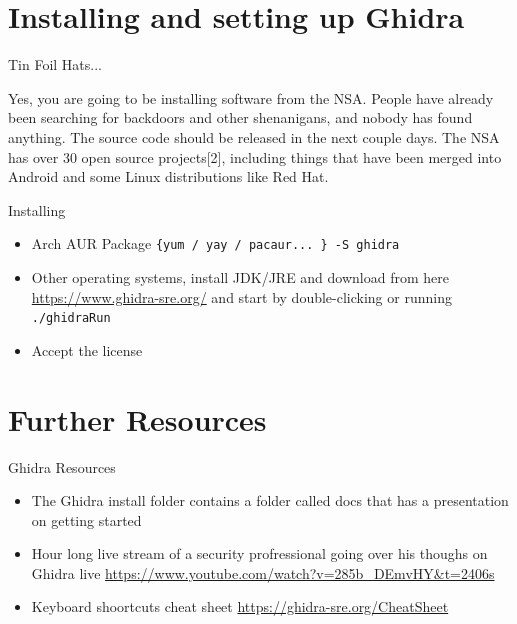 \documentclass{beamer}
\begin{document}
\section{Installing and setting up Ghidra}

\begin{frame}{Tin Foil Hats...}

  Yes, you are going to be installing software from the NSA. People
  have already been searching for backdoors and other shenanigans, and
  nobody has found anything. The source code should be released in the
  next couple days. The NSA has over 30 open source projects[2],
  including things that have been merged into Android and some Linux
  distributions like Red Hat.
\end{frame}

\begin{frame}{Installing}
  \begin{itemize}
    \item Arch AUR Package \texttt{\{yum / yay / pacaur... \} -S
        ghidra}
      \item Other operating systems, install JDK/JRE and download from
        here \url{https://www.ghidra-sre.org/} and start by
        double-clicking or running \texttt{./ghidraRun}
      \item Accept the license
  \end{itemize}
\end{frame}


\section{Further Resources}

\begin{frame}{Ghidra Resources}
  \begin{itemize}
    \item{ The Ghidra install folder contains a folder called docs
        that has a presentation on getting started }
    \item  {Hour long live stream of a security profressional going over his
      thoughs on Ghidra live
      \url{https://www.youtube.com/watch?v=285b_DEmvHY\&t=2406s}}
    \item {Keyboard shoortcuts cheat sheet
      \url{https://ghidra-sre.org/CheatSheet}}
    \end{itemize}
\end{frame}
\end{document}
